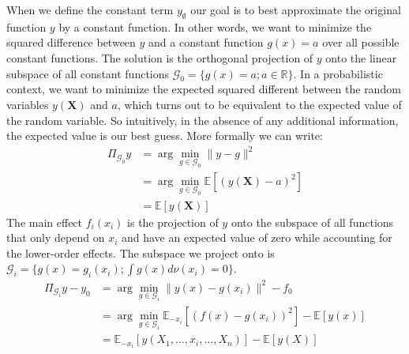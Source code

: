 When we define the constant term $y_\emptyset$ our goal is to best approximate the original function $y$ by a constant function. In other words, we want to minimize the squared difference between $y$ and a constant function $g(x) = a$ over all possible constant functions. The solution is the orthogonal projection of $y$ onto the linear subspace of all constant functions $\mathcal{G}_0 = \{g(x) = a; a \in \mathbb{R}\}$. In a probabilistic context, we want to minimize the expected squared different between the random variables $y(\boldsymbol{X})$ and $a$, which turns out to be equivalent to the expected value of the random variable. So intuitively, in the absence of any additional information, the expected value is our best guess. More formally we can write:
\begin{align*}
    \Pi_{\mathcal{G}_0}y
    &= \arg \min_{g \in \mathcal{G}_0} \|y - g\|^2 \\ %
    &= \arg \min_{g \in \mathcal{G}_0} \mathbb{E}[(y(\boldsymbol{X}) - a)^2] \\ %
    &= \mathbb{E}[y(\boldsymbol{X})]
\end{align*}
The main effect $f_i(x_i)$ is the projection of $y$ onto the subspace of all functions that only depend on $x_i$ and have an expected value of zero while accounting for the lower-order effects. The subspace we project onto is $\mathcal{G}_i = \{g(x) = g_i(x_i); \int g(x) d\nu (x_i) = 0\}$.
\begin{align*}
    \Pi_{\mathcal{G}_i}y - y_0
    &= \arg \min_{g \in \mathcal{G}_i} \|y(x) - g(x_i)\|^2 - f_0\\
    &= \arg \min_{g \in \mathcal{G}_i} \mathbb{E}_{-x_i}[(f(x) - g(x_i))^2] - \mathbb{E}[y(x)] \\
    &= \mathbb{E}_{-x_i}[y(X_1, \dots, x_i, \dots, X_n)] - \mathbb{E}[y(X)]
\end{align*}

